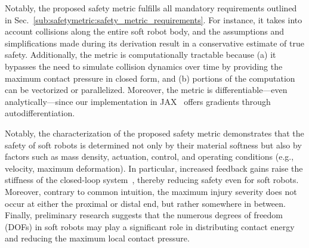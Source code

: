 Notably, the proposed safety metric fulfills all mandatory requirements outlined in Sec.~\ref{sub:safetymetric:safety_metric_requirements}. For instance, it takes into account collisions along the entire soft robot body, and the assumptions and simplifications made during its derivation result in a conservative estimate of true safety. Additionally, the metric is computationally tractable because (a) it bypasses the need to simulate collision dynamics over time by providing the maximum contact pressure in closed form, and (b) portions of the computation can be vectorized or parallelized. Moreover, the metric is differentiable—even analytically—since our implementation in JAX~\citep{jax2018github} offers gradients through autodifferentiation.

Notably, the characterization of the proposed safety metric demonstrates that the safety of soft robots is determined not only by their material softness but also by factors such as mass density, actuation, control, and operating conditions (e.g., velocity, maximum deformation). In particular, increased feedback gains raise the stiffness of the closed-loop system~\citep{della2017controlling, della2023model}, thereby reducing safety even for soft robots. Moreover, contrary to common intuition, the maximum injury severity does not occur at either the proximal or distal end, but rather somewhere in between. Finally, preliminary research suggests that the numerous degrees of freedom (\glspl{DOF}) in soft robots may play a significant role in distributing contact energy and reducing the maximum local contact pressure.


